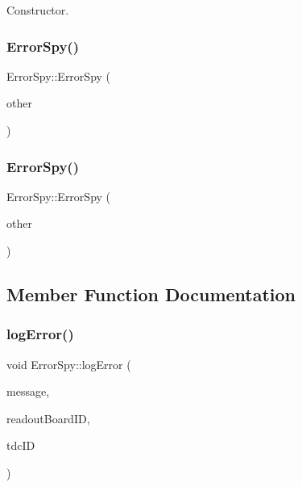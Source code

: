 Constructor. 

\mbox{\label{class_error_spy_aa10c8604df16528fa51fc00e9b84e184}} 
\subsubsection{\texorpdfstring{Error\+Spy()}{ErrorSpy()}\hspace{0.1cm}{\footnotesize\ttfamily [2/3]}}
{\footnotesize\ttfamily Error\+Spy\+::\+Error\+Spy (\begin{DoxyParamCaption}\item[{const \hyperlink{class_error_spy}{Error\+Spy} \&}]{other }\end{DoxyParamCaption})\hspace{0.3cm}{\ttfamily [delete]}}

\mbox{\label{class_error_spy_a07d843cb06eb0a6bfd47734b6c31e289}} 
\subsubsection{\texorpdfstring{Error\+Spy()}{ErrorSpy()}\hspace{0.1cm}{\footnotesize\ttfamily [3/3]}}
{\footnotesize\ttfamily Error\+Spy\+::\+Error\+Spy (\begin{DoxyParamCaption}\item[{const \hyperlink{class_error_spy}{Error\+Spy} \&\&}]{other }\end{DoxyParamCaption})\hspace{0.3cm}{\ttfamily [delete]}}



\subsection{Member Function Documentation}
\mbox{\label{class_error_spy_a5177c4dac196484a1a0ccaa231c033d8}} 
\subsubsection{\texorpdfstring{log\+Error()}{logError()}}
{\footnotesize\ttfamily void Error\+Spy\+::log\+Error (\begin{DoxyParamCaption}\item[{const std\+::string}]{message,  }\item[{const unsigned int}]{readout\+Board\+ID,  }\item[{const unsigned int}]{tdc\+ID }\end{DoxyParamCaption})}



